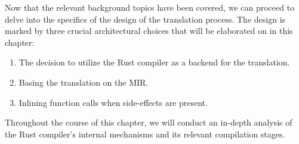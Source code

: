 \documentclass[../Thesis.tex]{subfiles}
\begin{document}
Now that the relevant background topics have been covered,
we can proceed to delve into the specifics of the design of the translation process.
The design is marked by three crucial architectural choices
that will be elaborated on in this chapter:

\begin{enumerate}
    \item The decision to utilize the Rust compiler as a backend for the translation.
    \item Basing the translation on the \acrfull{MIR}.
    \item Inlining function calls when side-effects are present.
\end{enumerate}

Throughout the course of this chapter,
we will conduct an in-depth analysis
of the Rust compiler's internal mechanisms and its relevant compilation stages.
\end{document}
